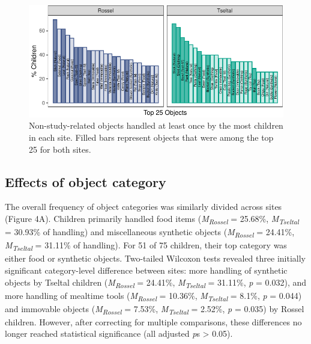 \documentclass[10pt, letterpaper]{article}
\newenvironment{CodeChunk}{}{}
\begin{document}
\begin{CodeChunk}
\begin{figure}[!ht]

{\centering \includegraphics{figs/top-objects-fig-1} 

}

\caption[Non-study-related objects handled at least once by the most children in each site]{Non-study-related objects handled at least once by the most children in each site. Filled bars represent objects that were among the top 25 for both sites.}\label{fig:top-objects-fig}
\end{figure}
\end{CodeChunk}

\hypertarget{effects-of-object-category}{%
\subsection{Effects of object
category}\label{effects-of-object-category}}

The overall frequency of object categories was similarly divided across
sites (Figure 4A). Children primarily handled food items
(\emph{M}\textsubscript{\emph{Rossel}} = 25.68\%,
\emph{M}\textsubscript{\emph{Tseltal}} = 30.93\% of handling) and
miscellaneous synthetic objects (\emph{M}\textsubscript{\emph{Rossel}} =
24.41\%, \emph{M}\textsubscript{\emph{Tseltal}} = 31.11\% of handling).
For 51 of 75 children, their top category was either food or synthetic
objects. Two-tailed Wilcoxon tests revealed three initially significant
category-level difference between sites: more handling of synthetic
objects by Tseltal children (\emph{M}\textsubscript{\emph{Rossel}} =
24.41\%, \emph{M}\textsubscript{\emph{Tseltal}} = 31.11\%, \emph{p} =
0.032), and more handling of mealtime tools
(\emph{M}\textsubscript{\emph{Rossel}} = 10.36\%,
\emph{M}\textsubscript{\emph{Tseltal}} = 8.1\%, \emph{p} = 0.044) and
immovable objects (\emph{M}\textsubscript{\emph{Rossel}} = 7.53\%,
\emph{M}\textsubscript{\emph{Tseltal}} = 2.52\%, \emph{p} = 0.035) by
Rossel children. However, after correcting for multiple comparisons,
these differences no longer reached statistical significance (all
adjusted \emph{p}s \textgreater{} 0.05).
\end{document}
